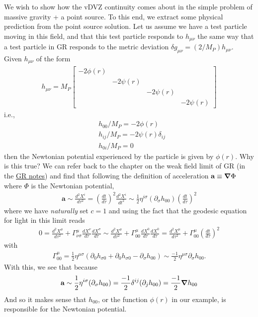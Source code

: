 \documentclass{book}
\theoremstyle{definition}
\newcommand{\p}{\partial}
\newcommand{\nn}{\nonumber}
\newcommand{\f}[2]{\frac{#1}{#2}}
\newcommand{\lp}{\left(}
\newcommand{\rp}{\right)}
\begin{document}
We wish to show how the vDVZ continuity comes about in the simple problem of massive gravity + a point source. To this end, we extract some physical prediction from the point source solution. Let us assume we have a test particle moving in this field, and that this test particle responds to $h_{\mu\nu}$ the same way that a test particle in GR responds to the metric deviation $\delta g_{\mu\nu} = (2/M_P)h_{\mu\nu}$. \\

Given $h_{\mu\nu}$ of the form
\begin{align}
\boxed{h_{\mu\nu} = M_P\begin{bmatrix}
-2\phi(r) &&&\\
&-2\psi(r)&&\\
&&-2\psi(r)&\\
&&&-2\psi(r)
\end{bmatrix}}
\end{align}
i.e.,
\begin{align}
&h_{00}/M_P = -2\phi(r) \nn\\
&h_{ij}/M_P = -2\psi(r)\delta_{ij} \nn\\
&h_{0i}/M_P = 0 
\end{align}
then the Newtonian potential experienced by the particle is given by $\phi(r)$. Why is this true? We can refer back to the chapter on the weak field limit of GR (in the \href{https://huanqbui.com/LaTeX projects/HuanBui_GR/HuanBui_GR.pdf}{\underline{GR notes}}) and find that following the definition of acceleration $\mathbf{a} \equiv \grad{\Phi}$ where $\Phi$ is the Newtonian potential,
\begin{align}
\mathbf{a}\sim \f{d^2X^i}{d\tau^2} = \lp \f{dt}{d\tau} \rp^2\f{d^2X^i}{dt^2} \sim \f{1}{2}\eta^{i\sigma}(\p_\sigma h_{00})\lp \f{dt}{d\tau} \rp^2
\end{align}
where we have \textit{naturally} set $c = 1$ and using the fact that the geodesic equation for light in this limit reads
\begin{align}
0 = \f{d^2X^\mu}{d\tau^2} + \Gamma^{\mu}_{\nu\sigma}\f{dX^\nu}{d\tau}\f{dX^\sigma}{d\tau} \sim \f{d^2X^\mu}{d\tau^2} + \Gamma^{\mu}_{00}\f{dX^0}{d\tau}\f{dX^0}{d\tau} = \f{d^2X^\mu}{d\tau^2} + \Gamma^{\mu}_{00}\lp\f{dt}{d\tau}\rp^2
\end{align}
with
\begin{align}
\Gamma^\mu_{00} = \f{1}{2}\eta^{\mu\sigma}\lp \p_0 h_{\sigma 0} + \p_0 h_{\sigma 0} - \p_\sigma h_{00} \rp \sim \f{-1}{2}\eta^{\mu\sigma}\p_\sigma h_{00}.
\end{align}
With this, we see that because
\begin{align}
\mathbf{a} \sim  \f{1}{2}\eta^{i\sigma}(\p_\sigma h_{00}) = \f{-1}{2}\delta^{ij}(\p_j h_{00}) = \f{-1}{2}\grad{h_{00}}
\end{align}
And so it makes sense that $h_{00}$, or the function $\phi(r)$ in our example, is responsible for the Newtonian potential. \\
\end{document}
